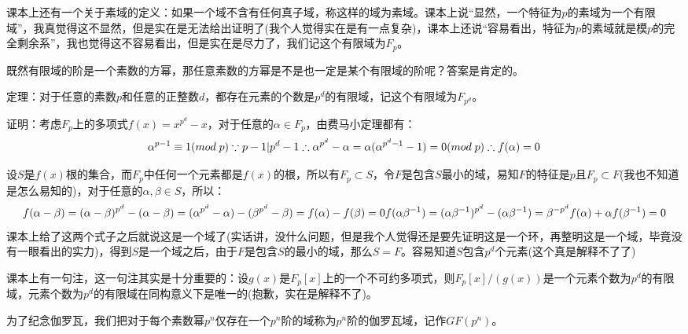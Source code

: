 \documentclass[12pt, a4paper, oneside]{ctexart}
\begin{document}
课本上还有一个关于素域的定义：如果一个域不含有任何真子域，称这样的域为素域。课本上说“显然，一个特征为$p$的素域为一个有限域”，我真觉得这不显然，但是实在是无法给出证明了(我个人觉得实在是有一点复杂)，课本上还说“容易看出，特征为$p$的素域就是模$p$的完全剩余系”，我也觉得这不容易看出，但是实在是尽力了，我们记这个有限域为$F_p$。

既然有限域的阶是一个素数的方幂，那任意素数的方幂是不是也一定是某个有限域的阶呢？答案是肯定的。

定理：对于任意的素数$p$和任意的正整数$d$，都存在元素的个数是$p^d$的有限域，记这个有限域为$F_{p^d}$。

证明：考虑$F_p$上的多项式$f(x)=x^{p^d}-x$，对于任意的$\alpha\in F_p$，由费马小定理都有：
\[
\alpha^{p-1}\equiv 1(mod\; p)\\
\because p-1|p^{d}-1\\
\therefore \alpha^{p^d}-\alpha=\alpha(\alpha^{p^d-1}-1)=0(mod\; p)\\
\therefore f(\alpha)=0
\]

设$S$是$f(x)$根的集合，而$F_p$中任何一个元素都是$f(x)$的根，所以有$F_p\subset S$，令$F$是包含$S$最小的域，易知$F$的特征是$p$且$F_p\subset F$(我也不知道是怎么易知的)，对于任意的$\alpha,\beta\in S$，所以：
\[
f(\alpha-\beta)=(\alpha-\beta)^{p^d}-(\alpha-\beta)=(\alpha^{p^d}-\alpha)-(\beta^{p^d}-\beta)=f(\alpha)-f(\beta)=0\\
f(\alpha\beta^{-1})=(\alpha\beta^{-1})^{p^d}-(\alpha\beta^{-1})=\beta^{-p^d}f(\alpha)+\alpha f(\beta^{-1})=0
\]
课本上给了这两个式子之后就说这是一个域了(实话讲，没什么问题，但是我个人觉得还是要先证明这是一个环，再整明这是一个域，毕竟没有一眼看出的实力)，得到$S$是一个域之后，由于$F$是包含$S$的最小的域，那么$S=F$。容易知道$S$包含$p^d$个元素(这个真是解释不了了)

课本上有一句注，这一句注其实是十分重要的：设$g(x)$是$F_p[x]$上的一个不可约多项式，则$F_p[x]/(g(x))$是一个元素个数为$p^d$的有限域，元素个数为$p^d$的有限域在同构意义下是唯一的(抱歉，实在是解释不了)。

为了纪念伽罗瓦，我们把对于每个素数幂$p^n$仅存在一个$p^n$阶的域称为$p^n$阶的伽罗瓦域，记作$GF(p^n)$。
\end{document}
